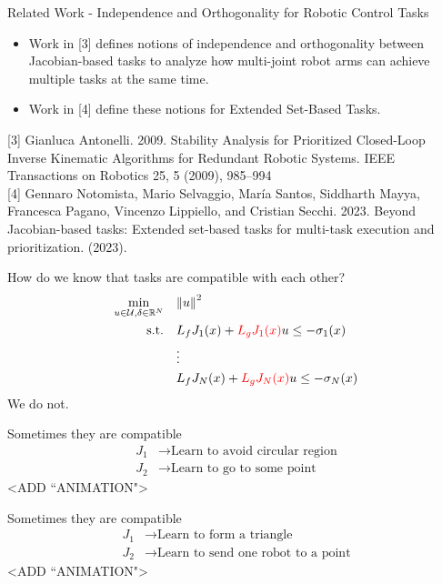 \begin{frame}{Related Work - Independence and Orthogonality for Robotic Control Tasks}
	\begin{itemize}
		\item{Work in [3] defines notions of independence and orthogonality between Jacobian-based tasks to analyze how multi-joint robot arms can achieve multiple tasks at the same time.}
		\item{Work in [4] define these notions for Extended Set-Based Tasks.}
	\end{itemize}

	\seprule
	\footnotesize{[3] Gianluca Antonelli. 2009. Stability Analysis for Prioritized Closed-Loop Inverse Kinematic Algorithms for Redundant Robotic Systems. IEEE Transactions on Robotics 25, 5 (2009), 985–994}\\
	\footnotesize{[4] Gennaro Notomista, Mario Selvaggio, María Santos, Siddharth Mayya, Francesca Pagano, Vincenzo Lippiello, and Cristian Secchi. 2023. Beyond Jacobian-based tasks: Extended set-based tasks for multi-task execution and prioritization. (2023).}

\end{frame}

\begin{frame}{How do we know that tasks are compatible with each other?}
	\begin{align*}
		\min_{u \in \mathcal{U}, \delta \in \mathbb{R}^N} \quad & { \lVert u \rVert }^2 \\
		\textrm{s.t.} \quad & L_f {J}_1 (x) + { \color{red} L_g {J}_1 (x) } u \le - \sigma_1(x) \\
                \quad & \vdots \\
		\quad & L_f {J}_N (x) + { \color{red} L_g {J}_N (x) } u \le - \sigma_N(x) \\
	\end{align*}
	\centering
	We do not.
\end{frame}

\begin{frame}{Sometimes they are compatible}
	\begin{align*}
		{J}_1 &\rightarrow \textrm{Learn to avoid circular region} \\
		{J}_2 &\rightarrow \textrm{Learn to go to some point}
	\end{align*}
	<ADD ``ANIMATION">
\end{frame}

\begin{frame}{Sometimes they are compatible}
	\begin{align*}
		{J}_1 &\rightarrow \textrm{Learn to form a triangle} \\
		{J}_2 &\rightarrow \textrm{Learn to send one robot to a point}
	\end{align*}
	<ADD ``ANIMATION">
\end{frame}

